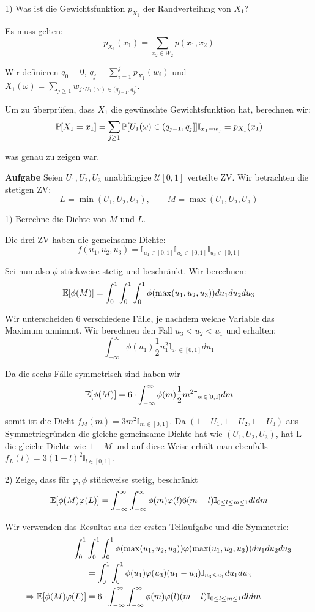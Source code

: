 1) Was ist die Gewichtsfunktion $p_{X_1}$ der Randverteilung von $X_1$?

Es muss gelten:
$$p_{X_1}(x_1) = \sum_{x_2 \in W_2} p(x_1, x_2)$$

Wir definieren $q_0 = 0$, $q_j = \sum_{i=1}^j p_{X_1}(w_i)$ und $X_1(\omega) = \sum_{j \geq 1}w_j \mathbb I_{U_1(\omega) \in (q_{j-1}, q_j]}$.

Um zu überprüfen, dass $X_1$ die gewünschte Gewichtsfunktion hat, berechnen wir:
$$\mathbb{P}[X_1 = x_1] = \sum_{j \geq 1} \mathbb{P} [U_1(\omega) \in (q_{j-1}, q_j]] \mathbb I_{x_1 = w_j} = p_{X_1}(x_1)$$

was genau zu zeigen war.

\hrulefill

\textbf{Aufgabe}
Seien $U_1, U_2, U_3$ unabhängige $\mathcal U[0,1]$ verteilte ZV. Wir betrachten die stetigen ZV:
$$L = \min(U_1, U_2, U_3), \qquad M = \max(U_1, U_2, U_3)$$

1) Berechne die Dichte von $M$ und $L$.

Die drei ZV haben die gemeinsame Dichte: 
$$f(u_1, u_2, u_3) = \mathbb I_{u_1 \in [0,1]} \mathbb I_{u_2 \in [0,1]} \mathbb I_{u_3 \in [0,1]}$$

Sei nun also $\phi$ stückweise stetig und beschränkt. Wir berechnen:
$$\mathbb{E}[\phi(M)] = \int_0^1 \int_0^1 \int_0^1 \phi(\max(u_1, u_2, u_3)) du_1 du_2 du_3$$

Wir unterscheiden 6 verschiedene Fälle, je nachdem welche Variable das Maximum annimmt. Wir berechnen den Fall $u_3 < u_2 < u_1$ und erhalten:
$$\int_{-\infty}^\infty \phi(u_1) \frac{1}{2} u_1^2 \mathbb I_{u_1 \in [0,1]} du_1$$

Da die sechs Fälle symmetrisch sind haben wir
$$\mathbb{E}[\phi(M)] = 6 \cdot \int_{-\infty}^\infty \phi(m) \frac{1}{2} m^2 \mathbb I_{m \in [0,1]} dm$$

somit ist die Dicht $f_M(m) = 3m^2 \mathbb I_{m \in [0,1]}$. Da $(1 - U_1, 1- U_2,1- U_3)$ aus Symmetriegründen die gleiche gemeinsame Dichte hat wie $(U_1, U_2, U_3)$, hat L die gleiche Dichte wie $1- M$ und auf diese Weise erhält man ebenfalls $f_L(l) = 3(1 - l)^2 \mathbb I_{l \in [0,1]}$. \smallskip

2) Zeige, dass für $\varphi, \phi$ stückweise stetig, beschränkt
$$\mathbb{E}[\phi(M) \varphi(L)] = \int_{-\infty}^\infty \int_{-\infty}^\infty \phi(m) \varphi(l) 6(m-l) \mathbb I_{0 \leq l \leq m \leq 1} dldm$$

Wir verwenden das Resultat aus der ersten Teilaufgabe und die Symmetrie:
\begin{align*}
	\int_0^1 & \int_0^1 \int_0^1 \phi(\max(u_1, u_2, u_3)) \varphi(\max(u_1, u_2, u_3)) du_1 du_2 du_3 \\
	&= \int_0^1 \int_0^1 \phi(u_1) \varphi(u_3) (u_1 - u_3) \mathbb I_{u_3 \leq u_1} du_1 du_3 \\
	\Rightarrow \mathbb{E}[\phi(M) \varphi(L)] &= 6 \cdot \int_{-\infty}^\infty \int_{-\infty}^\infty \phi(m) \varphi(l) (m-l) \mathbb I_{0 \leq l \leq m \leq 1} dldm
\end{align*}

